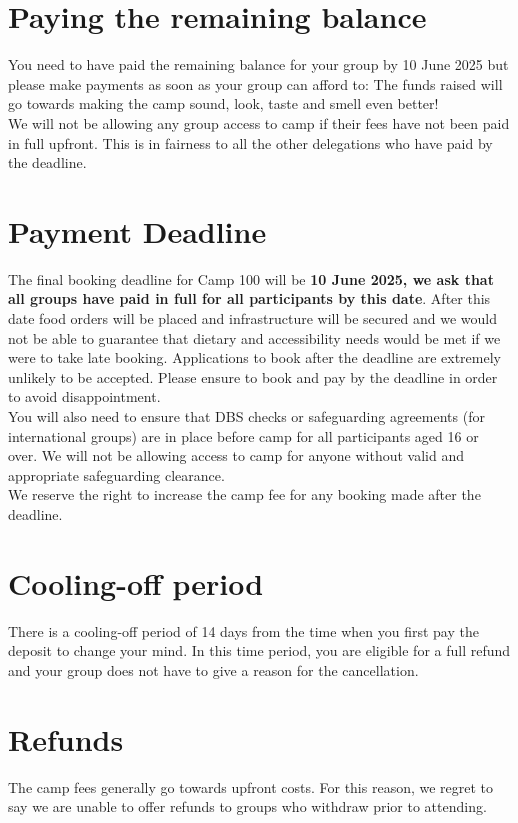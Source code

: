 \documentclass[a4paper, 11pt]{report}
\begin{document}
\section{Paying the remaining balance}
You need to have paid the remaining balance for your group by 10 June 2025 but please make payments as soon as your group can afford to: The funds raised will go towards making the camp sound, look, taste and smell even better! \\

We will not be allowing any group access to camp if their fees have not been paid in full upfront. This is in fairness to all the other delegations who have paid by the deadline.

\section{Payment Deadline}
The final booking deadline for Camp 100 will be \textbf{10 June 2025, we ask that all groups have paid in full for all participants by this date}. After this date food orders will be placed and infrastructure will be secured and we would not be able to guarantee that dietary and accessibility needs would be met if we were to take late booking. Applications to book after the deadline are extremely unlikely to be accepted. Please ensure to book and pay by the deadline in order to avoid disappointment. \\

You will also need to ensure that DBS checks or safeguarding agreements (for international groups) are in place before camp for all participants aged 16 or over. We will not be allowing access to camp for anyone without valid and appropriate safeguarding clearance. \\

We reserve the right to increase the camp fee for any booking made after the deadline.

\section{Cooling-off period}
There is a cooling-off period of 14 days from the time when you first pay the deposit to change your mind. In this time period, you are eligible for a full refund and your group does not have to give a reason for the cancellation. 

\section{Refunds}
The camp fees generally go towards upfront costs.  For this reason, we regret to say we are unable to offer refunds to groups who withdraw prior to attending. \\
\end{document}
